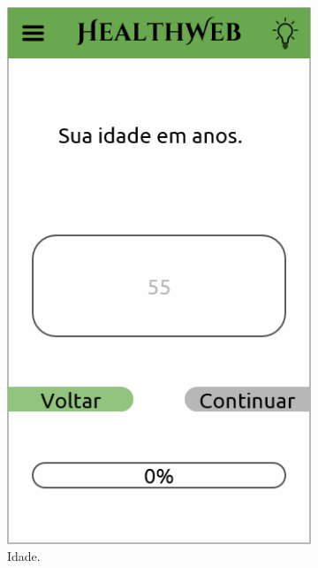 \begin{figure}[htbp]
\begin{subfigure}{0.24\linewidth}
		\includegraphics[width=\linewidth]{figure/prototype/mobile/age.png}
		\caption{Idade.}
		\label{fig:mobile:age}
	\end{subfigure}
	\hfill
	\begin{subfigure}{0.24\linewidth}
		\centering

\end{subfigure}
\end{figure}
